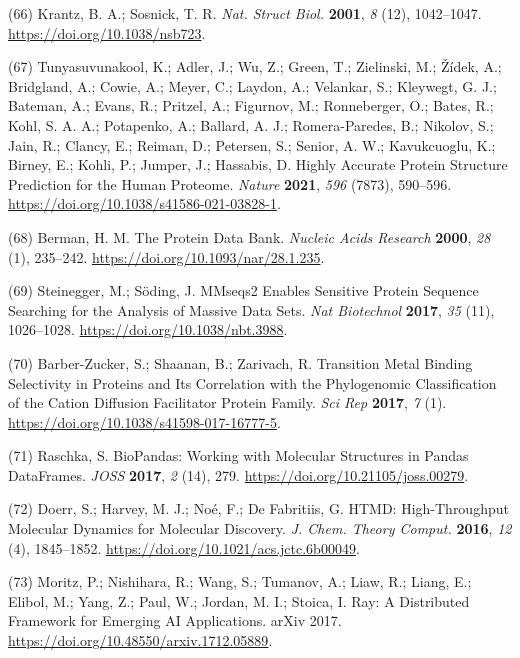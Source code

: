 \documentclass[ lineno,
  9pt]{elife}
\newenvironment{cslreferences}%
  {}%
  {\par}
\begin{document}
\begin{cslreferences}
\leavevmode\hypertarget{ref-85PeY3aG}{}%
(66) Krantz, B. A.; Sosnick, T. R. \emph{Nat. Struct Biol.} \textbf{2001}, \emph{8} (12), 1042--1047. \url{https://doi.org/10.1038/nsb723}.

\leavevmode\hypertarget{ref-10bYywzs6}{}%
(67) Tunyasuvunakool, K.; Adler, J.; Wu, Z.; Green, T.; Zielinski, M.; Žídek, A.; Bridgland, A.; Cowie, A.; Meyer, C.; Laydon, A.; Velankar, S.; Kleywegt, G. J.; Bateman, A.; Evans, R.; Pritzel, A.; Figurnov, M.; Ronneberger, O.; Bates, R.; Kohl, S. A. A.; Potapenko, A.; Ballard, A. J.; Romera-Paredes, B.; Nikolov, S.; Jain, R.; Clancy, E.; Reiman, D.; Petersen, S.; Senior, A. W.; Kavukcuoglu, K.; Birney, E.; Kohli, P.; Jumper, J.; Hassabis, D. Highly Accurate Protein Structure Prediction for the Human Proteome. \emph{Nature} \textbf{2021}, \emph{596} (7873), 590--596. \url{https://doi.org/10.1038/s41586-021-03828-1}.

\leavevmode\hypertarget{ref-8cYXwVxI}{}%
(68) Berman, H. M. The Protein Data Bank. \emph{Nucleic Acids Research} \textbf{2000}, \emph{28} (1), 235--242. \url{https://doi.org/10.1093/nar/28.1.235}.

\leavevmode\hypertarget{ref-jj6qOofE}{}%
(69) Steinegger, M.; Söding, J. MMseqs2 Enables Sensitive Protein Sequence Searching for the Analysis of Massive Data Sets. \emph{Nat Biotechnol} \textbf{2017}, \emph{35} (11), 1026--1028. \url{https://doi.org/10.1038/nbt.3988}.

\leavevmode\hypertarget{ref-FB5cckAJ}{}%
(70) Barber-Zucker, S.; Shaanan, B.; Zarivach, R. Transition Metal Binding Selectivity in Proteins and Its Correlation with the Phylogenomic Classification of the Cation Diffusion Facilitator Protein Family. \emph{Sci Rep} \textbf{2017}, \emph{7} (1). \url{https://doi.org/10.1038/s41598-017-16777-5}.

\leavevmode\hypertarget{ref-CcRTAd7h}{}%
(71) Raschka, S. BioPandas: Working with Molecular Structures in Pandas DataFrames. \emph{JOSS} \textbf{2017}, \emph{2} (14), 279. \url{https://doi.org/10.21105/joss.00279}.

\leavevmode\hypertarget{ref-q2gxO5bP}{}%
(72) Doerr, S.; Harvey, M. J.; Noé, F.; De Fabritiis, G. HTMD: High-Throughput Molecular Dynamics for Molecular Discovery. \emph{J. Chem. Theory Comput.} \textbf{2016}, \emph{12} (4), 1845--1852. \url{https://doi.org/10.1021/acs.jctc.6b00049}.

\leavevmode\hypertarget{ref-19MS2ZVR1}{}%
(73) Moritz, P.; Nishihara, R.; Wang, S.; Tumanov, A.; Liaw, R.; Liang, E.; Elibol, M.; Yang, Z.; Paul, W.; Jordan, M. I.; Stoica, I. Ray: A Distributed Framework for Emerging AI Applications. arXiv 2017. \url{https://doi.org/10.48550/arxiv.1712.05889}.


\end{cslreferences}
\end{document}
